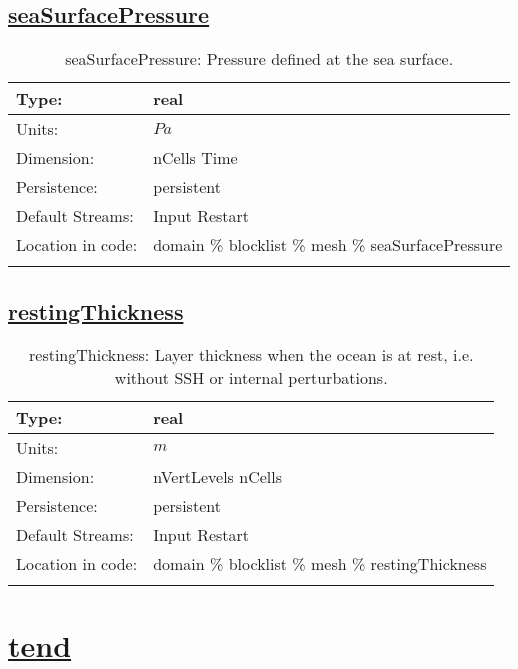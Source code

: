 \subsection[seaSurfacePressure]{\hyperref[sec:var_tab_mesh]{seaSurfacePressure}}
\label{subsec:var_sec_mesh_seaSurfacePressure}
\begin{center}
\begin{longtable}{| p{2.0in} | p{4.0in} |}
        \hline 
        Type: & real \\
        \hline 
        Units: & $Pa$ \\
        \hline 
        Dimension: & nCells Time \\
        \hline 
        Persistence: & persistent \\
        \hline 
		 Default Streams: & Input Restart  \\
        \hline 
		 Location in code: & domain \% blocklist \% mesh \% seaSurfacePressure \\
		 \hline 
    \caption{seaSurfacePressure: Pressure defined at the sea surface.}
\end{longtable}
\end{center}
\subsection[restingThickness]{\hyperref[sec:var_tab_mesh]{restingThickness}}
\label{subsec:var_sec_mesh_restingThickness}
\begin{center}
\begin{longtable}{| p{2.0in} | p{4.0in} |}
        \hline 
        Type: & real \\
        \hline 
        Units: & $m$ \\
        \hline 
        Dimension: & nVertLevels nCells \\
        \hline 
        Persistence: & persistent \\
        \hline 
		 Default Streams: & Input Restart  \\
        \hline 
		 Location in code: & domain \% blocklist \% mesh \% restingThickness \\
		 \hline 
    \caption{restingThickness: Layer thickness when the ocean is at rest, i.e. without SSH or internal perturbations.}
\end{longtable}
\end{center}
\section[tend]{\hyperref[sec:var_tab_tend]{tend}}
\label{sec:var_sec_tend}
